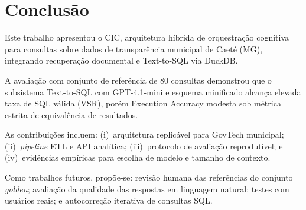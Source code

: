 \chapter{Conclusão}

Este trabalho apresentou o CIC, arquitetura híbrida de orquestração cognitiva para consultas sobre dados de transparência municipal de Caeté (MG), integrando recuperação documental e Text-to-SQL via DuckDB.

A avaliação com conjunto de referência de 80 consultas demonstrou que o subsistema Text-to-SQL com GPT-4.1-mini e esquema minificado alcança elevada taxa de SQL válida (VSR), porém Execution Accuracy modesta sob métrica estrita de equivalência de resultados.

As contribuições incluem: (i)~arquitetura replicável para GovTech municipal; (ii)~\textit{pipeline} ETL e API analítica; (iii)~protocolo de avaliação reprodutível; e (iv)~evidências empíricas para escolha de modelo e tamanho de contexto.

Como trabalhos futuros, propõe-se: revisão humana das referências do conjunto \textit{golden}; avaliação da qualidade das respostas em linguagem natural; testes com usuários reais; e autocorreção iterativa de consultas SQL.
